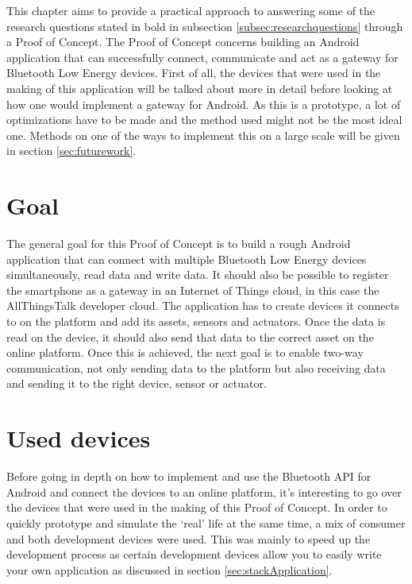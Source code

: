 \documentclass[pdftex,a4paper,12pt,twoside]{report}
\begin{document}
This chapter aims to provide a practical approach to answering some of the research questions stated in bold in subsection \ref{subsec:researchquestions} through a Proof of Concept. The Proof of Concept concerns building an Android application that can successfully connect, communicate and act as a gateway for Bluetooth Low Energy devices. First of all, the devices that were used in the making of this application will be talked about more in detail before looking at how one would implement a gateway for Android. As this is a prototype, a lot of optimizations have to be made and the method used might not be the most ideal one. Methods on one of the ways to implement this on a large scale will be given in section \ref{sec:futurework}.

\newpage{}

\section{Goal}
\label{sec:pocgoal}
The general goal for this Proof of Concept is to build a rough Android application that can connect with multiple Bluetooth Low Energy devices simultaneously, read data and write data. It should also be possible to register the smartphone as a gateway in an Internet of Things cloud, in this case the AllThingsTalk developer cloud. The application has to create devices it connects to on the platform and add its assets, sensors and actuators. Once the data is read on the device, it should also send that data to the correct asset on the online platform. Once this is achieved, the next goal is to enable two-way communication, not only sending data to the platform but also receiving data and sending it to the right device, sensor or actuator.

\section{Used devices}
\label{sec:devices}
Before going in depth on how to implement and use the Bluetooth API for Android and connect the devices to an online platform, it's interesting to go over the devices that were used in the making of this Proof of Concept. In order to quickly prototype and simulate the `real' life at the same time, a mix of consumer and both development devices were used. This was mainly to speed up the development process as certain development devices allow you to easily write your own application as discussed in section \ref{sec:stackApplication}.
\end{document}
